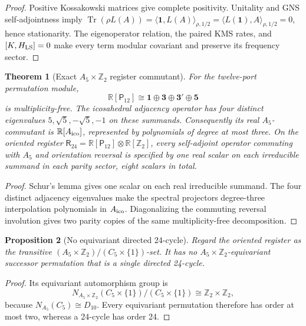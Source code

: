 \documentclass[11pt]{article}
\newtheorem{theorem}{Theorem}[section]
\newtheorem{proposition}[theorem]{Proposition}
\theoremstyle{remark}
\theoremstyle{plain}
\begin{document}
\begin{proof}
Positive Kossakowski matrices give complete positivity.  Unitality and GNS self-adjointness imply
\(\operatorname{Tr}(\rho L(A))=\langle\mathbf1,L(A)\rangle_{\rho,1/2}
=\langle L(\mathbf1),A\rangle_{\rho,1/2}=0\), hence stationarity.  The eigenoperator relation,
the paired KMS rates, and \([K,H_{\rm LS}]=0\) make every term modular covariant and preserve its
frequency sector.
\end{proof}

\begin{theorem}[Exact \(A_5\times\mathbb Z_2\) register commutant]
\label{thm:a5-register-commutant}
For the twelve-port permutation module,
\[
 \mathbb R[\mathsf P_{12}]
 \cong \mathbf1\oplus\mathbf3\oplus\mathbf3'\oplus\mathbf5
\]
is multiplicity-free.  The icosahedral adjacency operator has four distinct eigenvalues
\(5,\sqrt5,-\sqrt5,-1\) on these summands.  Consequently its real \(A_5\)-commutant is
\(\mathbb R[A_{\rm ico}]\), represented by polynomials of degree at most three.  On the oriented
register
\(\mathsf R_{24}=\mathbb R[\mathsf P_{12}]\otimes\mathbb R[\mathbb Z_2]\), every self-adjoint
operator commuting with \(A_5\) and orientation reversal is specified by one real scalar on each
irreducible summand in each parity sector, eight scalars in total.
\end{theorem}

\begin{proof}
Schur's lemma gives one scalar on each real irreducible summand.  The four distinct adjacency
eigenvalues make the spectral projectors degree-three interpolation polynomials in
\(A_{\rm ico}\).  Diagonalizing the commuting reversal involution gives two parity copies of the
same multiplicity-free decomposition.
\end{proof}

\begin{proposition}[No equivariant directed 24-cycle]
\label{prop:no-equivariant-24-cycle}
Regard the oriented register as the transitive
\((A_5\times\mathbb Z_2)/(C_5\times\{1\})\)-set.  It has no
\(A_5\times\mathbb Z_2\)-equivariant successor permutation that is a single directed 24-cycle.
\end{proposition}

\begin{proof}
Its equivariant automorphism group is
\[
 N_{A_5\times\mathbb Z_2}(C_5\times\{1\})/(C_5\times\{1\})
 \cong\mathbb Z_2\times\mathbb Z_2,
\]
because \(N_{A_5}(C_5)\cong D_{10}\).  Every equivariant permutation therefore has order at most
two, whereas a 24-cycle has order 24.
\end{proof}
\end{document}
